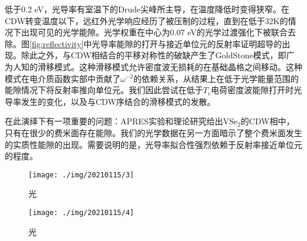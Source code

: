 \documentclass[reprint, aps, prb, showkeys]{revtex4-2}
\begin{document}
低于0.2 eV，光导率有室温下的Drude尖峰所主导，在温度降低时变得狭窄。在CDW转变温度以下，远红外光学响应经历了被压制的过程，直到在低于32K的情况下出现可见的光学能隙。光学权重在中心为0.07 eV的光学过渡强化下被联合去除。图\ref{fig:reflectivity}中光导率能隙的打开与接近单位元的反射率证明超导的出现。除此之外，与CDW相结合的平移对称性的破缺产生了GoldStone模式，即广为人知的滑移模式。这种滑移模式允许密度波无损耗的在基础晶格之间移动。这种模式在电介质函数实部中贡献了$\omega^{-2}$的依赖关系，从结果上在低于光学能量范围的能隙情况下将反射率推向单位元。我们因此尝试在低于$T_c$电荷密度波能隙打开时光导率发生的变化，以及与CDW序结合的滑移模式的发散。

在此演绎下有一项重要的问题：APRES实验和理论研究给出VSe$_2$的CDW相中，只有在很少的费米面存在能隙。我们的光学数据在另一方面暗示了整个费米面发生的实质性能隙的出现。需要说明的是，光导率拟合性强烈依赖于反射率接近单位元的程度。

\begin{figure}[t]
    \texttt{[image: ./img/20210115/3]}
    \caption{\label{fig:weight} 
    光
    }
\end{figure}

\begin{figure}[t]
    \texttt{[image: ./img/20210115/4]}
    \caption{\label{fig:weight} 
    光
    }
\end{figure}
\end{document}

